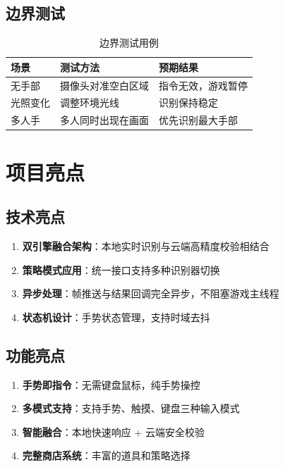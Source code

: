 \documentclass{article}
\begin{document}
\subsection{边界测试}

\begin{table}[H]
\centering
\begin{tabular}{|l|l|l|}
\hline
\textbf{场景} & \textbf{测试方法} & \textbf{预期结果} \\
\hline
无手部 & 摄像头对准空白区域 & 指令无效，游戏暂停 \\
\hline
光照变化 & 调整环境光线 & 识别保持稳定 \\
\hline
多人手 & 多人同时出现在画面 & 优先识别最大手部 \\
\hline
\end{tabular}
\caption{边界测试用例}
\end{table}

\newpage

\section{项目亮点}

\subsection{技术亮点}

\begin{enumerate}[leftmargin=*]
    \item \textbf{双引擎融合架构}：本地实时识别与云端高精度校验相结合
    \item \textbf{策略模式应用}：统一接口支持多种识别器切换
    \item \textbf{异步处理}：帧推送与结果回调完全异步，不阻塞游戏主线程
    \item \textbf{状态机设计}：手势状态管理，支持时域去抖
\end{enumerate}

\subsection{功能亮点}

\begin{enumerate}[leftmargin=*]
    \item \textbf{手势即指令}：无需键盘鼠标，纯手势操控
    \item \textbf{多模式支持}：支持手势、触摸、键盘三种输入模式
    \item \textbf{智能融合}：本地快速响应 + 云端安全校验
    \item \textbf{完整商店系统}：丰富的道具和策略选择
\end{enumerate}
\end{document}
